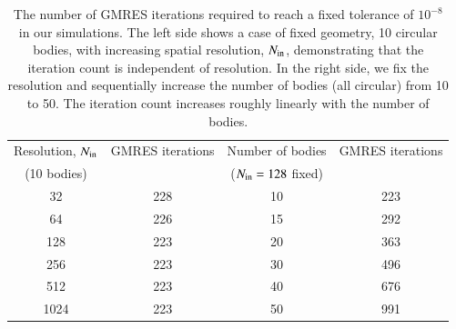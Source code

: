 \documentclass[preprint, 10pt]{elsarticle}
\begin{document}
\begin{table}%
\begin{center}
\caption{The number of GMRES iterations required to reach a fixed tolerance of $10^{-8}$ in our simulations. The left side shows a case of fixed geometry, 10 circular bodies, with increasing spatial resolution, $N_{\mathrm{in}}$, demonstrating that the iteration count is independent of resolution. In the right side, we fix the resolution and sequentially increase the number of bodies (all circular) from 10 to 50. The iteration count increases roughly linearly with the number of bodies.  }
\vspace{0.3 pc}
\label{itertab}
\begin{tabular}{c c | c c}
\hline
\hspace{0.5pc} Resolution, $N_{\mathrm{in}}$
\hspace{0.5pc} & GMRES iterations 
\hspace{0.5pc} &  Number of bodies
\hspace{0.5pc} & GMRES iterations  \\
\hspace{0.0pc} (10 bodies) &
\hspace{0.5pc} & ($N_{\mathrm{in}} = 128$ fixed) & \\
\hline
%
32	& 228	& 10 	& 223	\\
64    	& 226	& 15 	& 292	\\
128	& 223	& 20 	& 363	\\
256	& 223	& 30 	& 496	\\
512	& 223	& 40 	& 676	\\
1024	& 223	& 50 	& 991	\\
%
\hline
\end{tabular}
\end{center}
\end{table}
\end{document}
